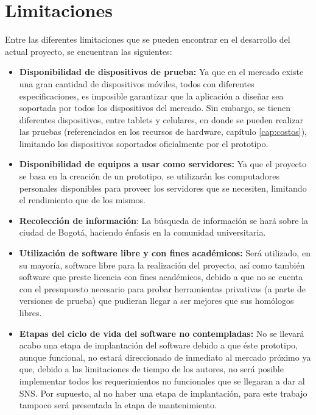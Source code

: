 \section{Limitaciones}

Entre las diferentes limitaciones que se pueden encontrar en el desarrollo del actual proyecto, se encuentran las siguientes:

\begin{itemize}
  \item \textbf{Disponibilidad de dispositivos de prueba:} Ya que en el mercado existe una gran cantidad de dispositivos móviles, todos con diferentes especificaciones, es imposible garantizar que la aplicación a diseñar sea soportada por todos los dispositivos del mercado. Sin embargo, se tienen diferentes dispositivos, entre tablets y celulares, en donde se pueden realizar las pruebas (referenciados en los recursos de hardware, capítulo \ref{cap:costos}), limitando los dispositivos soportados oficialmente por el prototipo.

  \item \textbf{Disponibilidad de equipos a usar como servidores:} Ya que el proyecto se basa en la creación de un prototipo, se utilizarán los computadores personales disponibles para proveer los servidores que se necesiten, limitando el rendimiento que de los mismos.
  
  \item \textbf{Recolección de información}: La búsqueda de información se hará sobre la ciudad de Bogotá, haciendo énfasis en la comunidad universitaria.
  
  \item \textbf{Utilización de software libre y con fines académicos:} Será utilizado, en su mayoría, software libre para la realización del proyecto, así como también software que preste licencia con fines académicos, debido a que no se cuenta con el presupuesto necesario para probar herramientas privativas (a parte de versiones de prueba) que pudieran llegar a ser mejores que sus homólogos libres.
  
  \item \textbf{Etapas del ciclo de vida del software no contempladas:} No se llevará acabo una etapa de implantación del software debido a que éste prototipo, aunque funcional, no estará direccionado de inmediato al mercado próximo ya que, debido a las limitaciones de tiempo de los autores, no será posible implementar todos los requerimientos no funcionales que se llegaran a dar al SNS. Por supuesto, al no haber una etapa de implantación, para este trabajo tampoco será presentada la etapa de mantenimiento.
\end{itemize}
